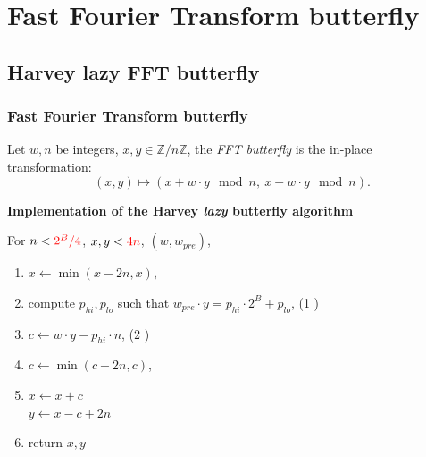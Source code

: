 \documentclass[10pt]{beamer}
\begin{document}
\section{Fast Fourier Transform butterfly}
\subsection{Harvey lazy FFT butterfly}
\begin{frame}
    \frametitle{Fast Fourier Transform butterfly}
    \begin{mybox}
    Let $w, n$ be integers, $x,y \in \mathbb{Z}/n\mathbb{Z}$, 
    the \textit{FFT butterfly}\cite{Cooley_Tukey_1965} is the in-place transformation: 
    \[
    (x,y) \mapsto (x + w\cdot y \mod n,\ x - w\cdot y \mod n).
    \]
    \end{mybox}
    
    \pause
    \bigskip
    \textbf{Implementation of the Harvey \textit{lazy} butterfly algorithm}\cite{DBLP:journals/corr/abs-1205-2926}
    
    \medskip
    For $n < \textcolor{red}{2^B /4}$, $x,y < \textcolor{red}{4n}$, $(w, w_{pre})$,
    \begin{enumerate}
        \item $x \gets \min(x-2n, x)$,
        \item compute $p_{hi}, p_{lo}$ such that $w_{pre} \cdot y = p_{hi}\cdot 2^B + p_{lo}$, \hfill (1 )
        \item $c \gets w\cdot y - p_{hi}\cdot n$, \hfill (2 )
        \item $c \gets \min(c-2n, c)$,
        \item $x\gets x + c$ \\
            $y \gets x - c + 2n$
        \item return $x,y$
    \end{enumerate}
\end{frame}
\end{document}
